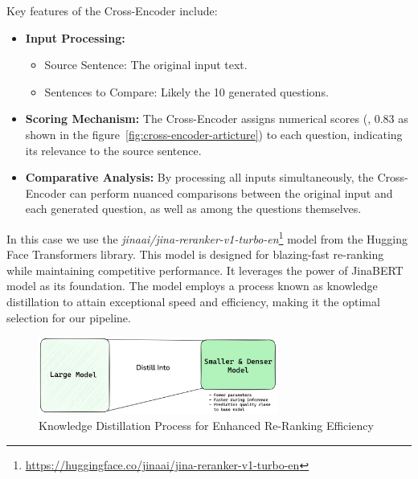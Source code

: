 Key features of the Cross-Encoder include:

\begin{itemize}
    \item \textbf{Input Processing:}
    \begin{itemize}
        \item Source Sentence: The original input text.
        \item Sentences to Compare: Likely the 10 generated questions.
    \end{itemize}
    \item \textbf{Scoring Mechanism:} The Cross-Encoder assigns numerical scores (\eg, 0.83 as shown in the figure~\ref{fig:cross-encoder-articture}) to each question, indicating its relevance to the source sentence.
    \item \textbf{Comparative Analysis:} By processing all inputs simultaneously, the Cross-Encoder can perform nuanced comparisons between the original input and each generated question, as well as among the questions themselves.
\end{itemize}

In this case we use the \textit{jinaai/jina-reranker-v1-turbo-en}\footnote{\url{https://huggingface.co/jinaai/jina-reranker-v1-turbo-en}} model from the Hugging Face Transformers library.
This model is designed for blazing-fast re-ranking while maintaining competitive performance.
It leverages the power of JinaBERT~\cite{günther2024jinaembeddings28192token} model as its foundation.
The model employs a process known as knowledge distillation to attain exceptional speed and efficiency, making it the optimal selection for our pipeline.

\begin{figure}[ht!]
    \centering
    \begin{minipage}[b]{\textwidth}
        \centering
        \includegraphics[width=0.7\textwidth]{res/knowledge-distill}
    \end{minipage}
    \caption{Knowledge Distillation Process for Enhanced Re-Ranking Efficiency}
    \label{fig:knowledge-distill}
\end{figure}

